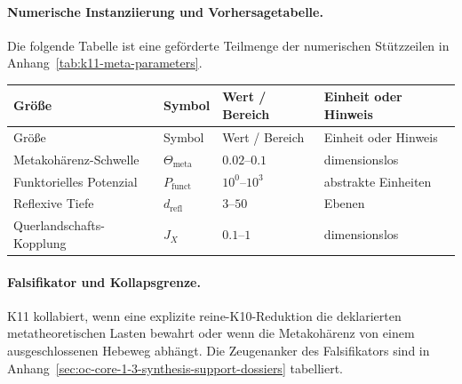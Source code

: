 \paragraph{Numerische Instanziierung und Vorhersagetabelle.}
Die folgende Tabelle ist eine geförderte Teilmenge der numerischen Stützzeilen in Anhang~\ref{tab:k11-meta-parameters}.
\begin{longtable}{@{}L{0.27\textwidth}L{0.15\textwidth}L{0.24\textwidth}L{0.16\textwidth}@{}}
\toprule
Größe & Symbol & Wert / Bereich & Einheit oder Hinweis \\
\midrule
\endfirsthead
\toprule
Größe & Symbol & Wert / Bereich & Einheit oder Hinweis \\
\midrule
\endhead
Metakohärenz-Schwelle & $\scriptstyle \Theta_{\mathrm{meta}}$ & $0.02\text{--}0.1$ & dimensionslos \\
Funktorielles Potenzial & $\scriptstyle P_{\mathrm{funct}}$ & $10^0\text{--}10^3$ & abstrakte Einheiten \\
Reflexive Tiefe & $\scriptstyle d_{\mathrm{refl}}$ & $3\text{--}50$ & Ebenen \\
Querlandschafts-Kopplung & $\scriptstyle J_X$ & $0.1\text{--}1$ & dimensionslos \\
\bottomrule
\end{longtable}

\paragraph{Falsifikator und Kollapsgrenze.}
K11 kollabiert, wenn eine explizite reine-K10-Reduktion die deklarierten metatheoretischen Lasten bewahrt oder wenn die Metakohärenz von einem ausgeschlossenen Hebeweg abhängt.
Die Zeugenanker des Falsifikators sind in Anhang~\ref{sec:oc-core-1-3-synthesis-support-dossiers} tabelliert.

